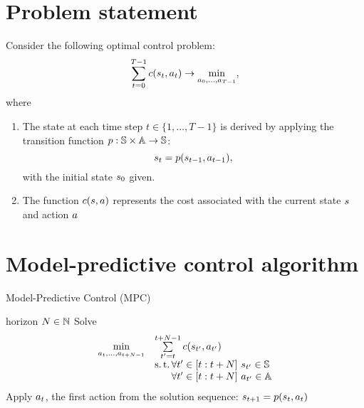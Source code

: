 \documentclass[12pt,twoside]{../../mitthesis}
\begin{document}
\section*{Problem statement}
Consider the following optimal control problem:
$$
    \sum_{t = 0}^{T-1}c(s_{t}, a_{t}) \rightarrow \min_{a_0, \ldots, a_{T-1}},
$$
where
\begin{enumerate}
    \item The state at each time step $t \in \{1, \ldots, T-1\}$ is derived by applying the transition function $p: \mathbb S \times \mathbb A \to \mathbb S$: 
    $$
        s_{t} = p(s_{t-1}, a_{t-1}),
    $$ 
    with the initial state $s_0$ given.
    \item The function $c(s, a)$ represents the cost associated with the current state $s$ and action $a$
\end{enumerate}

\section*{Model-predictive control algorithm}
\begin{algorithm}
    \caption{Model-Predictive Control (MPC)}
    \label{alg:my-alg}
    \begin{algorithmic}
         horizon $N \in {\mathbb{N}}$        
            \STATE Solve 
            \[
                \begin{array}{ll}
                    \min \limits_{\action_t, \dots, \action_{t+N-1}} & \sum \limits_{t^\prime=t}^{t+N-1} \cost( \state_{t^\prime}, \action_{t^\prime} ) \\
                    & \sut \forall t^\prime \in [t:t+N] \spc \state_{t^\prime} \in \states \\
                    & \hphantom{\sut} \forall t^\prime \in [t:t+N] \spc \action_{t^\prime} \in \actions
                \end{array}
            \]    
            \STATE Apply $a_t$, the first action from the solution sequence: $s_{t+1} = p(s_t, a_t)$
        \ENDFOR
    \end{algorithmic}  
\end{algorithm}
\end{document}
